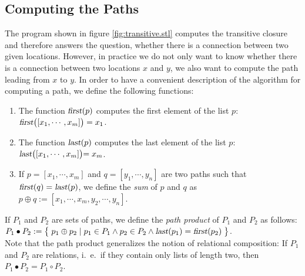 \subsection{Computing the Paths}
The program shown in figure \ref{fig:transitive.stl} computes the transitive closure and therefore
answers the question, whether there is a connection between two given locations.  However, in practice
we do not only want to know whether there is a connection between two locations $x$ and $y$, we also want to
compute the path leading from $x$ to $y$.    In order to
have a convenient description of the algorithm for computing a path, we define the following functions:
\begin{enumerate}
\item The function $\textsl{first}(p)$ computes the first element of the list $p$: \\[0.2cm]
      \hspace*{1.3cm} $\textsl{first}\bigl([x_1,\cdots,x_m]\bigr) = x_1$.
\item The function $\textsl{last}(p)$ computes the last element of the list $p$: \\[0.2cm]
      \hspace*{1.3cm} $\textsl{last}\bigl([x_1,\cdots,x_m]\bigl) = x_m$.
\item If  $p = [ x_1, \cdots, x_m ]$ and $q =[ y_1, \cdots, y_n ]$   are two paths such that
      $\textsl{first}(q) = \textsl{last}(p)$, we define the
      \emph{sum} of $p$ and $q$ as \\[0.2cm]
      \hspace*{1.3cm} $p \oplus q := [x_1, \cdots, x_m, y_2, \cdots, y_n ]$.
\end{enumerate}
If  $P_1$ and $P_2$ are sets of paths, we define the  \emph{path product} of
$P_1$ and $P_2$ as follows: 
\\[0.2cm]
\hspace*{1.3cm} 
$P_1 \bullet P_2 := \bigl\{\; p_1 \oplus p_2 \mid p_1 \in P_1 \wedge p_2 \in P_2 \wedge \textsl{last}(p_1) = \textsl{first}(p_2) \;\bigr\}$.
\\[0.2cm]
Note that the path product generalizes the notion of relational composition:
If $P_1$ and $P_2$ are relations, i.~e.~if they contain only lists of length two, then
$P_1 \bullet P_2 = P_1 \circ P_2$.


